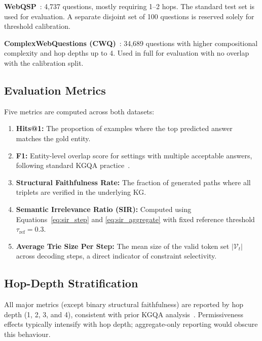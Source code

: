 \textbf{WebQSP}~\citep{yih2016websqp}: 4,737 questions, mostly requiring 1--2 hops. The standard test set is used for evaluation. A separate disjoint set of 100 questions is reserved solely for threshold calibration.

\textbf{ComplexWebQuestions (CWQ)}~\citep{talmor2018cwq}: 34,689 questions with higher compositional complexity and hop depths up to 4. Used in full for evaluation with no overlap with the calibration split.

\subsection{Evaluation Metrics}

Five metrics are computed across both datasets:

\begin{enumerate}
  \item \textbf{Hits@1:} The proportion of examples where the top predicted answer matches the gold entity.

  \item \textbf{F1:} Entity-level overlap score for settings with multiple acceptable answers, following standard KGQA practice~\citep{lan2022survey}.

  \item \textbf{Structural Faithfulness Rate:} The fraction of generated paths where all triplets are verified in the underlying KG.

  \item \textbf{Semantic Irrelevance Ratio (SIR):} Computed using Equations~\eqref{eq:sir_step} and \eqref{eq:sir_aggregate} with fixed reference threshold $\tau_{\text{ref}}=0.3$.

  \item \textbf{Average Trie Size Per Step:} The mean size of the valid token set $|\mathcal{V}_t|$ across decoding steps, a direct indicator of constraint selectivity.
\end{enumerate}

\subsection{Hop-Depth Stratification}

All major metrics (except binary structural faithfulness) are reported by hop depth (1, 2, 3, and 4), consistent with prior KGQA analysis~\citep{lan2022survey}. Permissiveness effects typically intensify with hop depth; aggregate-only reporting would obscure this behaviour.


